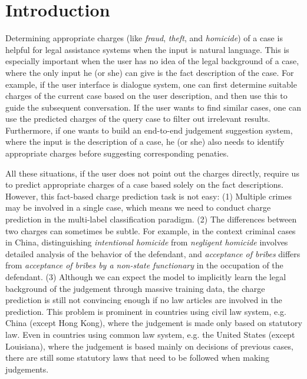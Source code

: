 \section{Introduction}
Determining appropriate charges (like \emph{fraud}, \emph{theft}, and \emph{homicide}) of a case is helpful for legal assistance systems when the input is natural language. This is especially important when the user has no idea of the legal background of a case, where the only input he (or she) can give is the fact description of the case.
For example, if the user interface is dialogue system, one can first determine suitable charges of the current case based on the user description, and then use this to guide the subsequent conversation. If the user wants to find similar cases, one can use the predicted charges of the query case to filter out irrelevant results. Furthermore, if one wants to build an end-to-end judgement suggestion system, where the input is the description of a case, he (or she) also needs to identify appropriate charges before suggesting corresponding penaties.

All these situations, if the user does not point out the charges directly, require us to predict appropriate charges of a case based solely on the fact descriptions. However, this fact-based charge prediction task is not easy:
(1) Multiple crimes may be involved in a single case, which means we need to conduct charge prediction in the multi-label classification paradigm. 
(2) The differences between two charges can sometimes be subtle. For example, in the context criminal cases in China, distinguishing \emph{intentional homicide} from \emph{negligent homicide} involves detailed analysis of the behavior of the defendant, and \emph{acceptance of bribes} differs from \emph{acceptance of bribes by a non-state functionary} in the occupation of the defendant. 
(3)  Although we can expect the model to implicitly learn the legal background of the judgement through massive training data, the charge prediction is still not convincing enough if no law articles are involved in the prediction. This problem is prominent in countries using civil law system, e.g. China (except Hong Kong), where the judgement is made only based on statutory law. Even in countries using common law system, e.g. the United States (except Louisiana), where the judgement is based mainly on decisions of previous cases, there are still some statutory laws that need to be followed when making judgements. 

